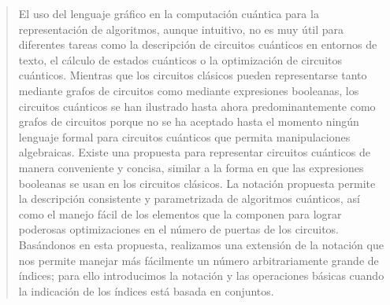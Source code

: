 \begin{abstract}
		El uso del lenguaje gráfico en la computación cuántica para la representación de algoritmos, aunque intuitivo, no es muy útil para diferentes tareas como la descripción de circuitos cuánticos en entornos de texto, el cálculo de estados cuánticos o la optimización de circuitos cuánticos.
		Mientras que los circuitos clásicos pueden representarse tanto mediante grafos de circuitos como mediante expresiones booleanas, los circuitos cuánticos se han ilustrado hasta ahora predominantemente como grafos de circuitos porque no se ha aceptado hasta el momento ningún lenguaje formal para circuitos cuánticos que permita manipulaciones algebraicas.
		Existe una propuesta para representar circuitos cuánticos de manera conveniente y concisa,
		similar a la forma en que las expresiones booleanas se usan en los circuitos clásicos.
		La notación propuesta permite la descripción consistente y parametrizada de algoritmos cuánticos, así como el manejo fácil de los elementos que la componen para lograr poderosas optimizaciones en el número de puertas de los circuitos.
		Basándonos en esta propuesta, realizamos una extensión de la notación que nos permite manejar más fácilmente un número arbitrariamente grande de índices; para ello introducimos la notación y las operaciones básicas cuando la indicación de los índices está basada en conjuntos.
\end{abstract}
